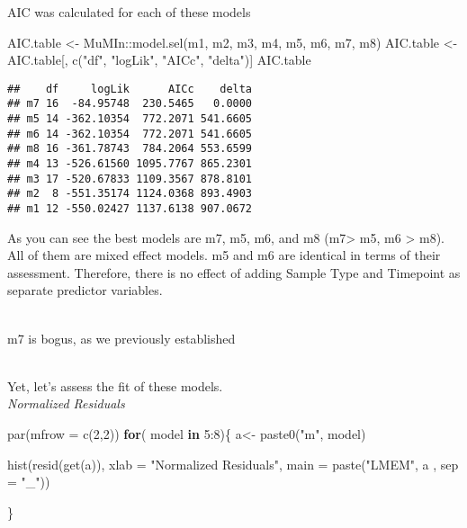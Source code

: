 \documentclass[
]{article}
\newenvironment{Shaded}{\begin{snugshade}}{\end{snugshade}}
\newcommand{\AttributeTok}[1]{\textcolor[rgb]{0.77,0.63,0.00}{#1}}
\newcommand{\ControlFlowTok}[1]{\textcolor[rgb]{0.13,0.29,0.53}{\textbf{#1}}}
\newcommand{\DecValTok}[1]{\textcolor[rgb]{0.00,0.00,0.81}{#1}}
\newcommand{\FunctionTok}[1]{\textcolor[rgb]{0.00,0.00,0.00}{#1}}
\newcommand{\NormalTok}[1]{#1}
\newcommand{\OtherTok}[1]{\textcolor[rgb]{0.56,0.35,0.01}{#1}}
\newcommand{\SpecialCharTok}[1]{\textcolor[rgb]{0.00,0.00,0.00}{#1}}
\newcommand{\StringTok}[1]{\textcolor[rgb]{0.31,0.60,0.02}{#1}}
\begin{document}
AIC was calculated for each of these models\\

\begin{Shaded}
\begin{Highlighting}[]
\NormalTok{AIC.table }\OtherTok{\textless{}{-}}\NormalTok{ MuMIn}\SpecialCharTok{::}\FunctionTok{model.sel}\NormalTok{(m1, m2, m3, m4, m5, m6, m7, m8)}
\NormalTok{AIC.table }\OtherTok{\textless{}{-}}\NormalTok{ AIC.table[, }\FunctionTok{c}\NormalTok{(}\StringTok{"df"}\NormalTok{, }\StringTok{"logLik"}\NormalTok{, }\StringTok{"AICc"}\NormalTok{, }\StringTok{"delta"}\NormalTok{)]}
\NormalTok{AIC.table}
\end{Highlighting}
\end{Shaded}

\begin{verbatim}
##    df     logLik      AICc    delta
## m7 16  -84.95748  230.5465   0.0000
## m5 14 -362.10354  772.2071 541.6605
## m6 14 -362.10354  772.2071 541.6605
## m8 16 -361.78743  784.2064 553.6599
## m4 13 -526.61560 1095.7767 865.2301
## m3 17 -520.67833 1109.3567 878.8101
## m2  8 -551.35174 1124.0368 893.4903
## m1 12 -550.02427 1137.6138 907.0672
\end{verbatim}

As you can see the best models are m7, m5, m6, and m8 (m7\textgreater{}
m5, m6 \textgreater{} m8). All of them are mixed effect models. m5 and
m6 are identical in terms of their assessment. Therefore, there is no
effect of adding Sample Type and Timepoint as separate predictor
variables.\\
\strut \\
m7 is bogus, as we previously established\\
\strut \\

Yet, let's assess the fit of these models.\\

\emph{Normalized Residuals }

\begin{Shaded}
\begin{Highlighting}[]
\FunctionTok{par}\NormalTok{(}\AttributeTok{mfrow =} \FunctionTok{c}\NormalTok{(}\DecValTok{2}\NormalTok{,}\DecValTok{2}\NormalTok{))}
\ControlFlowTok{for}\NormalTok{( model }\ControlFlowTok{in} \DecValTok{5}\SpecialCharTok{:}\DecValTok{8}\NormalTok{)\{}
\NormalTok{ a}\OtherTok{\textless{}{-}} \FunctionTok{paste0}\NormalTok{(}\StringTok{"m"}\NormalTok{, model)}
 
\FunctionTok{hist}\NormalTok{(}\FunctionTok{resid}\NormalTok{(}\FunctionTok{get}\NormalTok{(a)),}
      \AttributeTok{xlab =} \StringTok{"Normalized Residuals"}\NormalTok{,}
     \AttributeTok{main =} \FunctionTok{paste}\NormalTok{(}\StringTok{"LMEM"}\NormalTok{, a , }\AttributeTok{sep =} \StringTok{"\_"}\NormalTok{)) }
  
\NormalTok{\}}
\end{Highlighting}
\end{Shaded}
\end{document}
